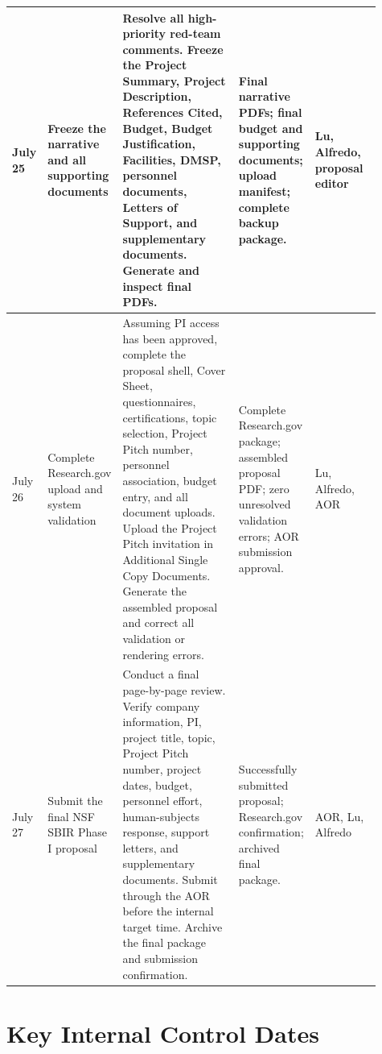 \documentclass[11pt,letterpaper]{article}
\begin{document}
\begin{landscape}
\begin{longtable}{
    L{0.075\linewidth}
    L{0.15\linewidth}
    L{0.32\linewidth}
    L{0.19\linewidth}
    L{0.18\linewidth}
}
\midrule

July 25 &
Freeze the narrative and all supporting documents &
Resolve all high-priority red-team comments. Freeze the Project Summary,
Project Description, References Cited, Budget, Budget Justification,
Facilities, DMSP, personnel documents, Letters of Support, and supplementary
documents. Generate and inspect final PDFs. &
Final narrative PDFs; final budget and supporting documents; upload manifest;
complete backup package. &
Lu, Alfredo, proposal editor \\

\midrule

July 26 &
Complete Research.gov upload and system validation &
Assuming PI access has been approved, complete the proposal shell, Cover
Sheet, questionnaires, certifications, topic selection, Project Pitch number,
personnel association, budget entry, and all document uploads. Upload the
Project Pitch invitation in Additional Single Copy Documents. Generate the
assembled proposal and correct all validation or rendering errors. &
Complete Research.gov package; assembled proposal PDF; zero unresolved
validation errors; AOR submission approval. &
Lu, Alfredo, AOR \\

\midrule

July 27 &
Submit the final NSF SBIR Phase I proposal &
Conduct a final page-by-page review. Verify company information, PI, project
title, topic, Project Pitch number, project dates, budget, personnel effort,
human-subjects response, support letters, and supplementary documents. Submit
through the AOR before the internal target time. Archive the final package and
submission confirmation. &
Successfully submitted proposal; Research.gov confirmation; archived final
package. &
AOR, Lu, Alfredo \\

\end{longtable}

\end{landscape}

\section{Key Internal Control Dates}
\end{document}
